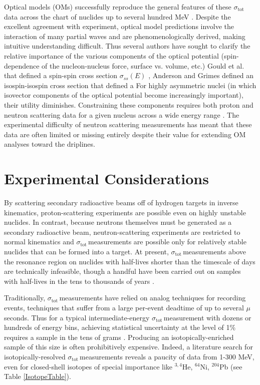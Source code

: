 \documentclass[twocolumn,secnumarabic,amssymb, nobibnotes, aps, prl,
superscriptaddress, nobalancelastpage]{revtex4}
\newcommand{\tots}{\ensuremath{\sigma_{\text{tot}}\,}}
\begin{document}
Optical models (OMs) successfully reproduce the general
features of these \tots data across the chart of nuclides up to several hundred
MeV \cite{}. Despite the excellent agreement with experiment, optical model
predictions involve the interaction of many partial waves and are
phenomenologically derived, making intuitive understanding difficult. Thus
several authors have sought to clarify the relative importance of the various components of 
the optical potential (spin-dependence of the nucleon-nucleus force, surface vs. volume, 
etc.) \cite{Gould1986, Anderson1990, Hodgson1967}
Gould et al. that defined a spin-spin cross section $\sigma_{ss}(E)$ \cite{Gould1986}, Anderson and Grimes defined an
isospin-isospin cross section that defined a For highly asymmetric nuclei (in which isovector components of 
the optical potential become increasingly important), their utility diminishes. 
Constraining these
components requires both proton and neutron scattering data for a
given nucleus across a wide energy range \cite{DOMPaper}.
The experimental difficulty of neutron scattering measurements has meant that these 
data are often limited or missing entirely despite their value for extending OM 
analyses toward the driplines.

\section{Experimental Considerations}
By scattering secondary radioactive beams off of hydrogen targets in inverse
kinematics, proton-scattering experiments are possible even on highly unstable
nuclides. In contrast, because neutrons themselves must
be generated as a secondary radioactive beam, neutron-scattering experiments are 
restricted to normal kinematics and \tots measurements are possible only for 
relatively stable nuclides that can be formed into a target. At present, 
\tots measurements above the resonance region on nuclides with half-lives shorter than
the timescale of days are technically infeasible, though a handful have been carried 
out on samples with half-lives in the tens to thousands of years
\cite{TritiumMeasurement, Tc99Measurement, U233Measurement}. 

Traditionally, \tots measurements have relied on analog techniques for
recording events, techniques that suffer from a large per-event deadtime of
up to several $\mu$seconds. Thus for a typical intermediate-energy \tots measurement 
with dozens or hundreds
of energy bins, achieving statistical uncertainty at the level of 1\% requires a 
sample in the tens of grams \cite{Finlay1993, Abfalterer2001}. Producing an 
isotopically-enriched sample of this size is often prohibitively 
expensive. Indeed, a literature search for isotopically-resolved \tots measurements
reveals a paucity of data from 1-300 MeV, even for closed-shell isotopes of special 
importance like $^{3,4}$He, $^{64}$Ni, $^{204}$Pb (see Table \ref{IsotopeTable}).
\end{document}
